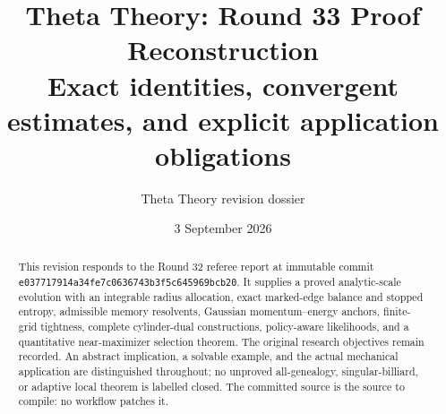 \documentclass[11pt]{article}
\title{Theta Theory: Round 33 Proof Reconstruction\\\large Exact identities, convergent estimates, and explicit application obligations}
\author{Theta Theory revision dossier}
\date{3 September 2026}
\begin{document}
\maketitle
\begin{abstract}
This revision responds to the Round 32 referee report at immutable commit
\texttt{e037717914a34fe7c0636743b3f5c645969bcb20}.  It supplies a proved
analytic-scale evolution with an integrable radius allocation, exact
marked-edge balance and stopped entropy, admissible memory resolvents,
Gaussian momentum--energy anchors, finite-grid tightness, complete
cylinder-dual constructions, policy-aware likelihoods, and a quantitative
near-maximizer selection theorem.  The original research objectives remain
recorded.  An abstract implication, a solvable example, and the actual
mechanical application are distinguished throughout; no unproved
all-genealogy, singular-billiard, or adaptive local theorem is labelled closed.
The committed source is the source to compile: no workflow patches it.
\end{abstract}
\reviewnote
\tableofcontents
\clearpage

\clearpage

\clearpage

\clearpage

\clearpage

\clearpage

\clearpage

\clearpage

\clearpage

\clearpage

\clearpage

\end{document}

